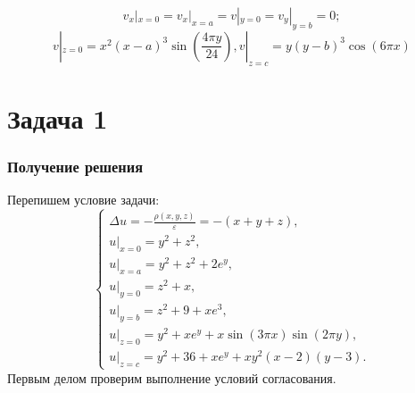 \documentclass[11pt]{article}
\begin{document}
$$v_x|_{x=0}=v_x|_{x=a}=v|_{y=0}=v_y|_{y=b}=0;$$
$$v|_{z=0}=x^2(x-a)^3\sin{(\frac{4\pi y}{24})}, v|_{z=c}=y(y-b)^3\cos{(6\pi x)}$$
\newpage
\section*{Задача 1}
\subsubsection*{Получение решения}
Перепишем условие задачи:
$$\begin{cases}
    \Delta u=-\frac{\rho(x,y,z)}{\varepsilon}=-(x+y+z),\\
    u|_{x=0}=y^2+z^2,\\
    u|_{x=a}=y^2+z^2+2e^y,\\
    u|_{y=0}=z^2+x,\\
    u|_{y=b}=z^2+9+xe^3,\\
    u|_{z=0}=y^2+xe^y+x\sin{(3\pi x)}\sin{(2\pi y)},\\
    u|_{z=c}=y^2+36+xe^y+xy^2(x-2)(y-3).
\end{cases}$$
Первым делом проверим выполнение условий согласования. 
\end{document}
